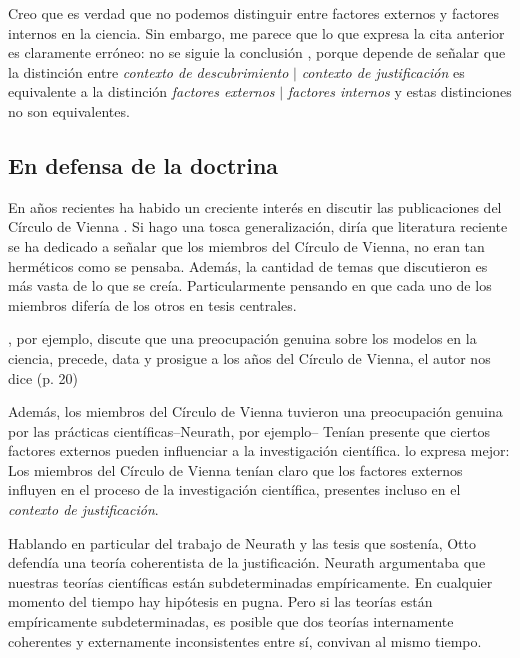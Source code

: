 Creo que es verdad que no podemos distinguir entre factores externos y factores internos en la ciencia.
Sin embargo, me parece que lo que expresa la cita anterior es claramente erróneo: no se siguie la conclusión , porque depende de señalar que la distinción entre  \emph{contexto de descubrimiento} $|$ \emph{contexto de justificación} es equivalente a la distinción \emph{factores externos} $|$ \emph{factores internos} y estas distinciones no son equivalentes.



\subsection{En defensa de la doctrina}

\noindent En años recientes ha habido un creciente interés en discutir las publicaciones del Círculo de Vienna \parencite{Bentley2023, Richardson2023, Suarez2024, Riel2014}.
Si hago una tosca generalización, diría que literatura reciente se ha dedicado a señalar que los miembros del Círculo de Vienna, no eran tan herméticos como se pensaba.
Además, la cantidad de temas que discutieron es más vasta de lo que se creía.
Particularmente pensando en que cada uno de los miembros difería de los otros en tesis centrales.

\textcite{Suarez2024}, por ejemplo, discute que una preocupación genuina sobre los modelos en la ciencia, precede, data y prosigue a los años del Círculo de Vienna, el autor nos dice  (p. 20)

Además, los miembros del Círculo de Vienna tuvieron una preocupación genuina por las prácticas científicas--Neurath, por ejemplo--
Tenían presente que ciertos factores externos pueden influenciar a la investigación científica.
\textcite[][p. 24]{Bentley2023} lo expresa mejor: 
Los miembros del Círculo de Vienna tenían claro que los factores externos influyen en el proceso de la investigación científica, presentes incluso en el \emph{contexto de justificación}.

Hablando en particular del trabajo de Neurath y las tesis que sostenía, Otto defendía una teoría coherentista de la justificación.
Neurath argumentaba que nuestras teorías científicas están subdeterminadas empíricamente.
En cualquier momento del tiempo hay hipótesis en pugna.
Pero si las teorías están empíricamente subdeterminadas, es posible que dos teorías internamente coherentes y externamente inconsistentes entre sí, convivan al mismo tiempo.

